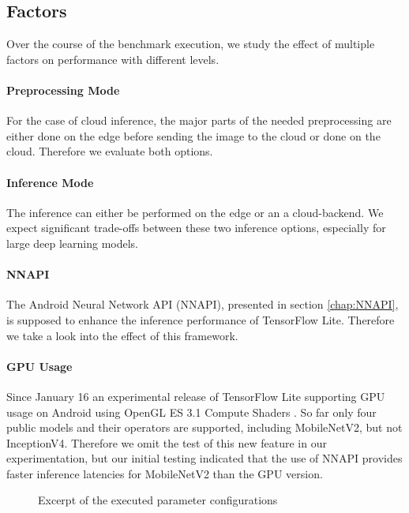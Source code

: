 \subsection{Factors}
Over the course of the benchmark execution, we study the effect of multiple factors on performance with different levels.

\paragraph{Preprocessing Mode}
For the case of cloud inference, the major parts of the needed preprocessing are either done on the edge before sending the image to the cloud or done on the cloud. Therefore we evaluate both options.
\paragraph{Inference Mode}
The inference can either be performed on the edge or an a cloud-backend.
We expect significant trade-offs between these two inference options, especially for large deep learning models.


\paragraph{NNAPI}
The Android Neural Network API (NNAPI), presented in section \ref{chap:NNAPI}, is supposed to enhance the inference performance of TensorFlow Lite. Therefore we take a look into the effect of this framework.
\paragraph{GPU Usage}
Since January 16 an experimental release of TensorFlow Lite supporting GPU usage on Android using OpenGL ES 3.1 Compute Shaders \cite{tfLiteGPU}.
So far only four public models and their operators are supported, including MobileNetV2, but not InceptionV4. 
Therefore we omit the test of this new feature in our experimentation, but our initial testing indicated that the use of NNAPI provides faster inference latencies for MobileNetV2 than the GPU version.


\begin{figure}[!htb]
\centering
 \scalebox{.7}{}

\caption{Excerpt of the executed parameter configurations}
\label{fig:tree}
\end{figure}


